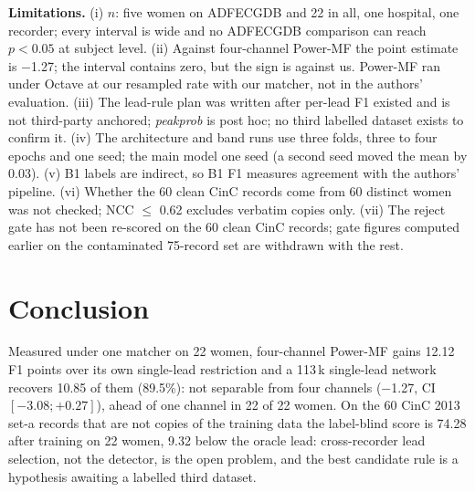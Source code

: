 \documentclass[10pt,twocolumn,a4paper]{article}
\begin{document}
\textbf{Limitations.} (i) $n$: five women on ADFECGDB and 22 in all, one hospital, one recorder;
every interval is wide and no ADFECGDB comparison can reach $p<0.05$ at subject level. (ii) Against
four-channel Power-MF the point estimate is $-$1.27; the interval contains zero, but the sign is
against us. Power-MF ran under Octave at our resampled rate with our matcher, not in the authors'
evaluation. (iii) The lead-rule plan was written after per-lead F1 existed and is not third-party
anchored; \emph{peakprob} is post hoc; no third labelled dataset exists to confirm it. (iv) The
architecture and band runs use three folds, three to four epochs and one seed; the main model one seed
(a second seed moved the mean by 0.03). (v) B1 labels are indirect, so B1 F1 measures agreement with
the authors' pipeline. (vi) Whether the 60 clean CinC records come from 60 distinct women was not
checked; NCC $\le$ 0.62 excludes verbatim copies only. (vii) The reject gate has not been re-scored
on the 60 clean CinC records; gate figures computed earlier on the contaminated 75-record set are withdrawn with the rest.

\section{Conclusion}
Measured under one matcher on 22 women, four-channel Power-MF gains 12.12 F1 points over its own
single-lead restriction and a 113\,k single-lead network recovers 10.85 of them (89.5\%): not separable
from four channels ($-$1.27, CI $[-3.08;+0.27]$), ahead of one channel in 22 of 22 women. On the 60
CinC 2013 set-a records that are not copies of the training data the label-blind score is 74.28 after
training on 22 women, 9.32 below the oracle lead: cross-recorder lead selection, not the detector, is
the open problem, and the best candidate rule is a hypothesis awaiting a labelled third dataset.


\scriptsize

\end{document}
